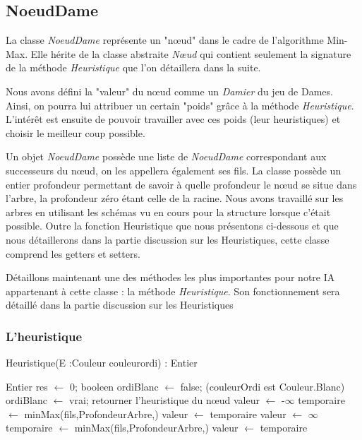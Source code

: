 \documentclass[12,french]{report}
\begin{document}
\subsection{NoeudDame}

La classe \textit{NoeudDame} représente un "nœud" dans le cadre de l'algorithme Min-Max. Elle hérite de la classe abstraite \textit{Nœud} qui contient seulement la signature de la méthode \textit{Heuristique} que l'on détaillera dans la suite. 


Nous avons défini la "valeur" du nœud comme un \textit{Damier} du jeu de Dames. Ainsi, on pourra lui attribuer un certain "poids" grâce à la méthode \textit{Heuristique}.\\ 
L'intérêt est ensuite de pouvoir travailler avec ces poids (leur heuristiques) et choisir le meilleur coup possible.

Un objet \textit{NoeudDame} possède une liste de \textit{NoeudDame} correspondant aux successeurs du nœud, on les appellera également ses fils. La classe possède un entier profondeur permettant de savoir à quelle profondeur le nœud se situe dans l'arbre, la profondeur zéro étant celle de la racine. Nous avons travaillé sur les arbres en utilisant les schémas vu en cours pour la structure lorsque c'était possible.
Outre la fonction Heuristique que nous présentons ci-dessous et que nous détaillerons dans la partie discussion sur les Heuristiques, cette classe comprend les getters et setters.

Détaillons maintenant une des méthodes les plus importantes pour notre IA appartenant à cette classe : la méthode \textit{Heuristique}.
Son fonctionnement sera détaillé dans la partie discussion sur les Heuristiques

\subsubsection{L'heuristique}

\begin{algorithm}
	\caption{Heuristique(E :Couleur couleurordi) : Entier}
	\begin{algorithmic}
		\State  Entier res $\leftarrow$ 0;
			\State booleen ordiBlanc $\leftarrow$ false;
		\If (couleurOrdi est Couleur.Blanc) 
		\State ordiBlanc $\leftarrow$ vrai;
		\EndIf
		\State retourner l'heuristique du nœud
		\EndIf
		\State valeur $\leftarrow$ -$\infty$
		\State temporaire $\leftarrow$ minMax(fils,ProfondeurArbre,)
		\State valeur $\leftarrow$ temporaire
		\EndIf
		\EndFor
		\Else
		\State valeur $\leftarrow$ $\infty$
		\State temporaire $\leftarrow$ minMax(fils,ProfondeurArbre,)
		\State valeur $\leftarrow$ temporaire
		\EndIf
		\EndIf
	\end{algorithmic}
\end{algorithm}\vspace{0.4cm}
\end{document}
